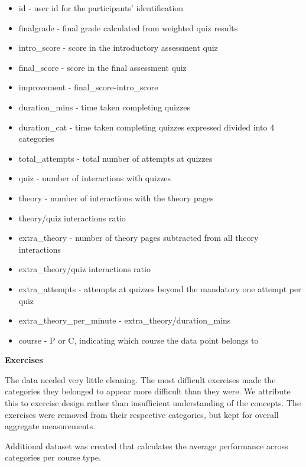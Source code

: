 \begin{itemize}
    \item id - user id for the participants' identification
    \item finalgrade - final grade calculated from weighted quiz results
    \item intro\_score - score in the introductory assessment quiz 
    \item final\_score - score in the final assessment quiz
    \item improvement - final\_score-intro\_score
    \item duration\_mins - time taken completing quizzes
    \item duration\_cat - time taken completing quizzes expressed divided into 4 categories 
    \item total\_attempts - total number of attempts at quizzes
    \item quiz -  number of interactions with quizzes
    \item theory - number of interactions with the theory pages
    \item theory/quiz interactions ratio
    \item extra\_theory - number of theory pages subtracted from all theory interactions
    \item extra\_theory/quiz interactions ratio
    \item extra\_attempts - attempts at quizzes beyond the mandatory one attempt per quiz
    \item extra\_theory\_per\_minute - extra\_theory/duration\_mins
    \item course - P or C, indicating which course the data point belongs to
\end{itemize}

\textbf{Exercises}

The data needed very little cleaning. The most difficult exercises made the categories they belonged to appear more difficult than they were. We attribute this to exercise design rather than insufficient understanding of the concepts. The exercises were removed from their respective categories, but kept for overall aggregate measurements. 

Additional dataset was created that calculates the average performance across categories per course type.